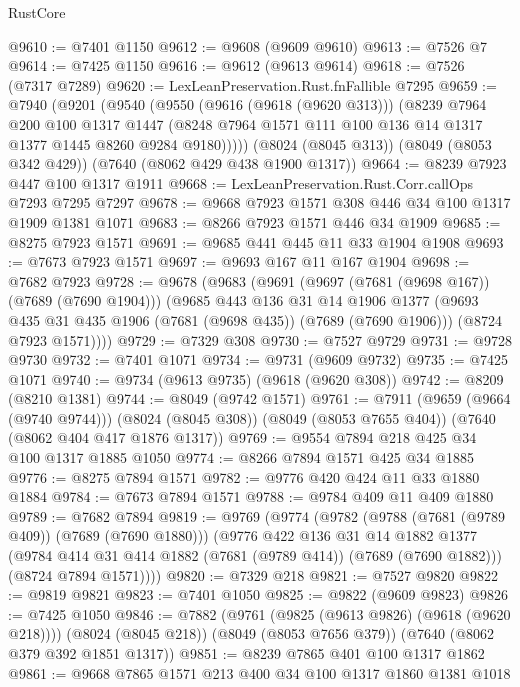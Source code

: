 \begin{lexlean}{RustCore}
\begin{coremodule}
@9610 := @7401 @1150
@9612 := @9608 (@9609 @9610)
@9613 := @7526 @7
@9614 := @7425 @1150
@9616 := @9612 (@9613 @9614)
@9618 := @7526 (@7317 @7289)
@9620 := LexLeanPreservation.Rust.fnFallible @7295
@9659 := @7940
    (@9201
      (@9540
        (@9550
          (@9616 (@9618 (@9620 @313)))
          (@8239
            @7964
            @200
            @100
            @1317
            @1447
            (@8248 @7964 @1571 @111 @100 @136 @14 @1317 @1377 @1445 @8260 @9284 @9180)))))
    (@8024 (@8045 @313))
    (@8049 (@8053 @342 @429))
    (@7640 (@8062 @429 @438 @1900 @1317))
@9664 := @8239 @7923 @447 @100 @1317 @1911
@9668 := LexLeanPreservation.Rust.Corr.callOps @7293 @7295 @7297
@9678 := @9668 @7923 @1571 @308 @446 @34 @100 @1317 @1909 @1381 @1071
@9683 := @8266 @7923 @1571 @446 @34 @1909
@9685 := @8275 @7923 @1571
@9691 := @9685 @441 @445 @11 @33 @1904 @1908
@9693 := @7673 @7923 @1571
@9697 := @9693 @167 @11 @167 @1904
@9698 := @7682 @7923
@9728 := @9678
    (@9683
      (@9691
        (@9697 (@7681 (@9698 @167)) (@7689 (@7690 @1904)))
        (@9685
          @443
          @136
          @31
          @14
          @1906
          @1377
          (@9693 @435 @31 @435 @1906 (@7681 (@9698 @435)) (@7689 (@7690 @1906)))
          (@8724 @7923 @1571))))
@9729 := @7329 @308
@9730 := @7527 @9729
@9731 := @9728 @9730
@9732 := @7401 @1071
@9734 := @9731 (@9609 @9732)
@9735 := @7425 @1071
@9740 := @9734 (@9613 @9735) (@9618 (@9620 @308))
@9742 := @8209 (@8210 @1381)
@9744 := @8049 (@9742 @1571)
@9761 := @7911
    (@9659 (@9664 (@9740 @9744)))
    (@8024 (@8045 @308))
    (@8049 (@8053 @7655 @404))
    (@7640 (@8062 @404 @417 @1876 @1317))
@9769 := @9554 @7894 @218 @425 @34 @100 @1317 @1885 @1050
@9774 := @8266 @7894 @1571 @425 @34 @1885
@9776 := @8275 @7894 @1571
@9782 := @9776 @420 @424 @11 @33 @1880 @1884
@9784 := @7673 @7894 @1571
@9788 := @9784 @409 @11 @409 @1880
@9789 := @7682 @7894
@9819 := @9769
    (@9774
      (@9782
        (@9788 (@7681 (@9789 @409)) (@7689 (@7690 @1880)))
        (@9776
          @422
          @136
          @31
          @14
          @1882
          @1377
          (@9784 @414 @31 @414 @1882 (@7681 (@9789 @414)) (@7689 (@7690 @1882)))
          (@8724 @7894 @1571))))
@9820 := @7329 @218
@9821 := @7527 @9820
@9822 := @9819 @9821
@9823 := @7401 @1050
@9825 := @9822 (@9609 @9823)
@9826 := @7425 @1050
@9846 := @7882
    (@9761 (@9825 (@9613 @9826) (@9618 (@9620 @218))))
    (@8024 (@8045 @218))
    (@8049 (@8053 @7656 @379))
    (@7640 (@8062 @379 @392 @1851 @1317))
@9851 := @8239 @7865 @401 @100 @1317 @1862
@9861 := @9668 @7865 @1571 @213 @400 @34 @100 @1317 @1860 @1381 @1018

\end{coremodule}
\end{lexlean}
